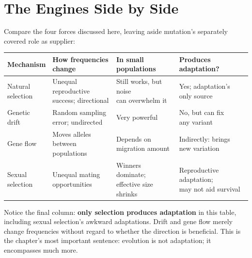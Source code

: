 \section{The Engines Side by Side}

Compare the four forces discussed here, leaving aside mutation's separately covered role as supplier:

\begin{table}[htbp]
\centering
\begin{tabular}{llll}
\toprule
Mechanism & \shortstack[l]{How frequencies\\change} & \shortstack[l]{In small\\populations} & \shortstack[l]{Produces\\adaptation?} \\
\midrule
\shortstack[l]{Natural\\selection} & \shortstack[l]{Unequal reproductive\\success; directional} & \shortstack[l]{Still works, but noise\\can overwhelm it} & \shortstack[l]{Yes; adaptation's\\only source} \\
\shortstack[l]{Genetic\\drift} & \shortstack[l]{Random sampling\\error; undirected} & Very powerful & \shortstack[l]{No, but can fix\\any variant} \\
Gene flow & \shortstack[l]{Moves alleles\\between populations} & \shortstack[l]{Depends on\\migration amount} & \shortstack[l]{Indirectly: brings\\new variation} \\
\shortstack[l]{Sexual\\selection} & \shortstack[l]{Unequal mating\\opportunities} & \shortstack[l]{Winners dominate;\\effective size shrinks} & \shortstack[l]{Reproductive adaptation;\\may not aid survival} \\
\bottomrule
\end{tabular}
\end{table}

Notice the final column: \textbf{only selection produces adaptation} in this table, including sexual selection's awkward adaptations. Drift and gene flow merely change frequencies without regard to whether the direction is beneficial. This is the chapter's most important sentence: evolution is not adaptation; it encompasses much more.

